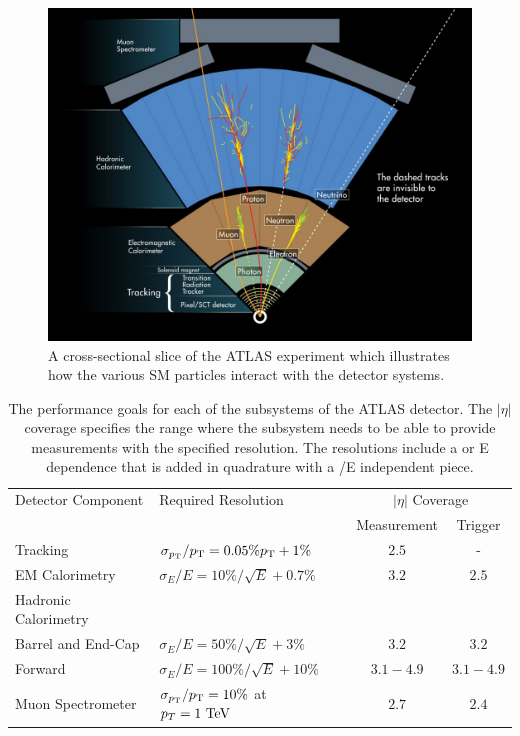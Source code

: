 \begin{figure}[hbtp]
\includegraphics[width=\fullfig]{figures/particle_interactions.png}
\caption{A cross-sectional slice of the \ac{ATLAS} experiment which illustrates how the various \ac{SM} particles interact with the detector systems.}
\label{fig:particle_interactions}
\end{figure}

\begin{table}
\centering
\begin{tabular}{llcc}
  \hline
  Detector Component & Required Resolution & \multicolumn{2}{c}{$|\eta|$ Coverage} \\
                     &                     & Measurement & Trigger \\
  \hline
  Tracking & $\sigma_{p_{\mathrm{T}}}/p_{\mathrm{T}} = 0.05\% p_{\mathrm{T}} + 1\%$ & $2.5$ & - \\
  EM Calorimetry & $\sigma_{E}/E = 10\%/\sqrt{E} + 0.7\%$ & $3.2$ & $2.5$ \\
  Hadronic Calorimetry & & \\
  \quad Barrel and End-Cap & $\sigma_{E}/E = 50\%/\sqrt{E} + 3\%$ & $3.2$ & $3.2$ \\
  \quad Forward & $\sigma_{E}/E = 100\%/\sqrt{E} + 10\%$ & $3.1 - 4.9$ & $3.1 - 4.9$ \\
  Muon Spectrometer & $\sigma_{p_{\mathrm{T}}}/p_{\mathrm{T}} = 10\%$ at $p_T = 1\ \mathrm{Te\kern -0.05em V}$ & $2.7$ & $2.4$ \\
  \hline
\end{tabular}
\caption{The performance goals for each of the subsystems of the \ac{ATLAS} detector. The $|\eta|$ coverage specifies the range where the subsystem needs to be able to provide measurements with the specified resolution. The resolutions include a \pt or E dependence that is added in quadrature with a \pt/E independent piece.}
\label{tab:performance_goals}
\end{table}

